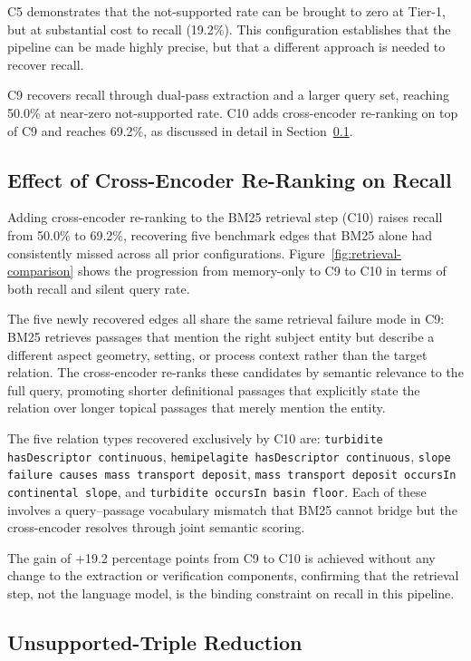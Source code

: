\documentclass[10pt]{article}
\newcommand{\pred}[1]{\texttt{\small #1}}
\begin{document}
C5 demonstrates that the not-supported rate can be brought to
zero at Tier-1, but at substantial cost to recall (19.2\%).
This configuration establishes that the pipeline can be made
highly precise, but that a different approach is needed to recover
recall.

C9 recovers recall through dual-pass extraction and a larger
query set, reaching 50.0\% at near-zero not-supported rate.
C10 adds cross-encoder re-ranking on top of C9 and reaches
69.2\%, as discussed in detail in Section~\ref{sec:run11}.
\subsection{Effect of Cross-Encoder Re-Ranking on Recall}
\label{sec:run11}

Adding cross-encoder re-ranking to the BM25 retrieval
step (C10) raises recall from 50.0\% to 69.2\%,
recovering five benchmark edges that BM25 alone had
consistently missed across all prior configurations.
Figure~\ref{fig:retrieval-comparison} shows the
progression from memory-only to C9 to C10 in terms
of both recall and silent query rate.

The five newly recovered edges all share the same
retrieval failure mode in C9: BM25 retrieves passages
that mention the right subject entity but describe a
different aspect  geometry, setting, or process
context  rather than the target relation.
The cross-encoder re-ranks these candidates by
semantic relevance to the full query, promoting
shorter definitional passages that explicitly state
the relation over longer topical passages that merely
mention the entity.

The five relation types recovered exclusively by C10
are: \pred{turbidite hasDescriptor continuous},
\pred{hemipelagite hasDescriptor continuous},
\pred{slope failure causes mass transport deposit},
\pred{mass transport deposit occursIn continental
slope}, and \pred{turbidite occursIn basin floor}.
Each of these involves a query--passage vocabulary
mismatch that BM25 cannot bridge but the cross-encoder
resolves through joint semantic scoring.

The gain of +19.2 percentage points from C9 to C10
is achieved without any change to the extraction or
verification components, confirming that the retrieval
step, not the language model, is the binding constraint
on recall in this pipeline.
\subsection{Unsupported-Triple Reduction}
\label{sec:halluc-decomp}
\end{document}
